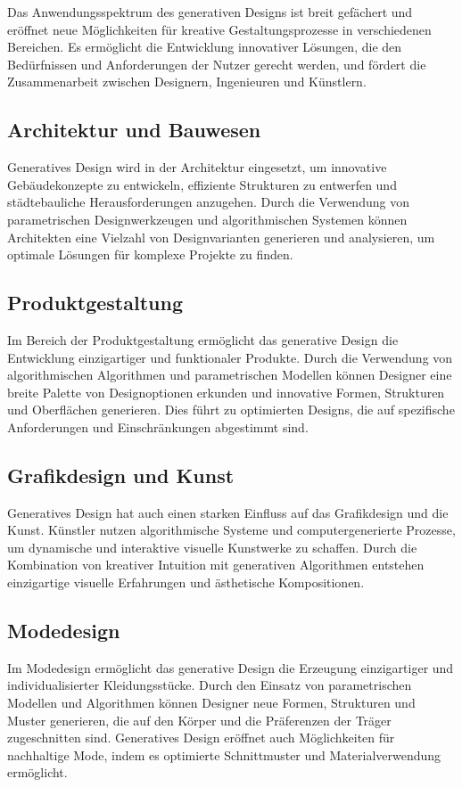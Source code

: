 Das Anwendungsspektrum des generativen Designs ist breit gefächert und eröffnet neue Möglichkeiten für kreative Gestaltungsprozesse in verschiedenen Bereichen. Es ermöglicht die Entwicklung innovativer Lösungen, die den Bedürfnissen und Anforderungen der Nutzer gerecht werden, und fördert die Zusammenarbeit zwischen Designern, Ingenieuren und Künstlern.

\subsection*{Architektur und Bauwesen}
Generatives Design wird in der Architektur eingesetzt, um innovative Gebäudekonzepte zu entwickeln, effiziente Strukturen zu entwerfen und städtebauliche Herausforderungen anzugehen. Durch die Verwendung von parametrischen Designwerkzeugen und algorithmischen Systemen können Architekten eine Vielzahl von Designvarianten generieren und analysieren, um optimale Lösungen für komplexe Projekte zu finden.

\subsection*{Produktgestaltung}
Im Bereich der Produktgestaltung ermöglicht das generative Design die Entwicklung einzigartiger und funktionaler Produkte. Durch die Verwendung von algorithmischen Algorithmen und parametrischen Modellen können Designer eine breite Palette von Designoptionen erkunden und innovative Formen, Strukturen und Oberflächen generieren. Dies führt zu optimierten Designs, die auf spezifische Anforderungen und Einschränkungen abgestimmt sind.

\subsection*{Grafikdesign und Kunst}
Generatives Design hat auch einen starken Einfluss auf das Grafikdesign und die Kunst. Künstler nutzen algorithmische Systeme und computergenerierte Prozesse, um dynamische und interaktive visuelle Kunstwerke zu schaffen. Durch die Kombination von kreativer Intuition mit generativen Algorithmen entstehen einzigartige visuelle Erfahrungen und ästhetische Kompositionen.

\subsection*{Modedesign}
Im Modedesign ermöglicht das generative Design die Erzeugung einzigartiger und individualisierter Kleidungsstücke. Durch den Einsatz von parametrischen Modellen und Algorithmen können Designer neue Formen, Strukturen und Muster generieren, die auf den Körper und die Präferenzen der Träger zugeschnitten sind. Generatives Design eröffnet auch Möglichkeiten für nachhaltige Mode, indem es optimierte Schnittmuster und Materialverwendung ermöglicht.

